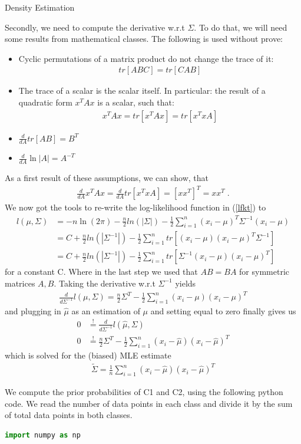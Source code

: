 \documentclass[
ngerman,
]{tudaexercise}
\newcommand{\sni}{\sum_{i=1}^{n}}
\begin{document}
\begin{task}{Density Estimation}
\begin{subtask}
	Secondly, we need to compute the derivative w.r.t $\Sigma$. To do that, we will need some results from mathematical classes. The following is used without prove:
	\begin{itemize}
		\item Cyclic permutations of a matrix product do not change the trace of it:\begin{align*}
		tr\left[ ABC\right] = tr\left[ CAB\right] 
		\end{align*}
		\item The trace of a scalar is the scalar itself. In particular: the result of a quadratic form $x^T Ax$ is a scalar, such that:\begin{align*}
		x^T Ax=tr\left[ x^TAx\right] =tr\left[ x^TxA\right] 
		\end{align*}
		\item $\frac{d}{dA}tr\left[ AB\right] =B^T$
		\item $\frac{d}{dA}\ln|A|=A^{-T}$
	\end{itemize}
	As a first result of these assumptions, we can show, that\begin{align*}
	\frac{d}{dA}x^T Ax=\frac{d}{dA}tr\left[ x^T xA\right] =\left[ xx^T\right] ^T=xx^T\;.
	\end{align*} 
	We now got the tools to re-write the log-likelihood function in (\ref{lfkt}) to
	\begin{align*}
	l(\mu,\Sigma)&=-n\ln(2\pi)-\frac{n}{2}ln(|\Sigma|)-\frac{1}{2}\sni (x_i-\mu)^T\Sigma^{-1}(x_i-\mu)\\&=C+\frac{n}{2}ln(|\Sigma^{-1}|)-\frac{1}{2}\sni tr\left[ (x_i-\mu)(x_i-\mu)^T \Sigma^{-1}\right] \\&=C+\frac{n}{2}ln(|\Sigma^{-1}|)-\frac{1}{2}\sni tr\left[\Sigma^{-1} (x_i-\mu)(x_i-\mu)^T \right] 
	\end{align*}
	for a constant C. Where in the last step we used that $AB=BA$ for symmetric matrices $A, B$. Taking the derivative w.r.t $\Sigma^{-1}$ yields
	\begin{align*}
	\frac{d}{d\Sigma^{-1}}l(\mu,\Sigma)=\frac{n}{2}\Sigma^T-\frac{1}{2}\sni(x_i-\mu)(x_i-\mu)^T
	\end{align*}
	and plugging in $\hat{\mu}$ as an estimation of $\mu$ and setting equal to zero finally gives us
	\begin{align*}
	0&\stackrel{!}{=}\frac{d}{d\Sigma^{-1}}l(\hat{\mu},\Sigma)\\
	0&\stackrel{!}{=}\frac{n}{2}\Sigma^T-\frac{1}{2}\sni(x_i-\hat{\mu})(x_i-\hat{\mu})^T
	\end{align*}
	which is solved for the (biased) MLE estimate
	\begin{align}\label{bsigma}
	\tilde{\Sigma}=\frac{1}{n}\sni (x_i-\hat{\mu})(x_i-\hat{\mu})^T
	\end{align}
\end{subtask}
	\begin{subtask}
		We compute the prior probabilities of C1 and C2, using the following python code. We read the number of data points in each class and divide it by the sum of total data points in both classes.
		\begin{lstlisting}[language=Python]
	import numpy as np
	

\end{lstlisting}
\end{subtask}
\end{task}
\end{document}

